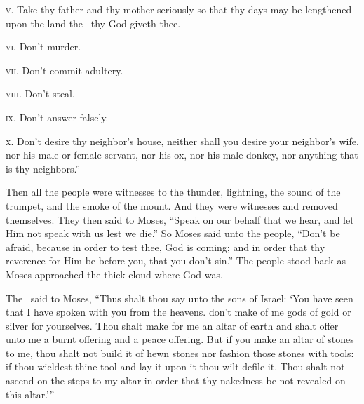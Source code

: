 \begin{inparaenum}
   \textsc{v.} Take thy father and thy mother seriously so that thy days may be lengthened upon the land the \lord\ thy God giveth thee.%
  
   \textsc{vi.} Don't murder.%
  
   \textsc{vii.} Don't commit adultery.%
  
   \textsc{viii.} Don't steal.%
  
   \textsc{ix.} Don't answer falsely.%
  
   \textsc{x.} Don't desire thy neighbor's house, neither shall you desire your neighbor's wife, nor his male or female servant, nor his ox, nor his male donkey, nor anything that is thy neighbors.''%
  
   Then all the people were witnesses to the thunder, lightning, the sound of the trumpet, and the smoke of the mount. And they were witnesses and removed themselves.%
   They then said to Moses, ``Speak on our behalf that we hear, and let Him not speak with us lest we die.''%
   So Moses said unto the people, ``Don't be afraid, because in order to test thee, God is coming; and in order that thy reverence for Him be before you, that you don't sin.''%
   The people stood back as Moses approached the thick cloud where God was.%
  
   The \lord\ said to Moses, ``Thus shalt thou say unto the sons of Israel: `You have seen that I have spoken with you from the heavens.%
   don't make of me gods of gold or silver for yourselves.%
   Thou shalt make for me an altar of earth and shalt offer unto me a burnt offering and a peace offering.%
   But if you make an altar of stones to me, thou shalt not build it of hewn stones nor fashion those stones with tools: if thou wieldest thine tool and lay it upon it thou wilt defile it.%
   Thou shalt not ascend on the steps to my altar in order that thy nakedness be not revealed on this altar.'\thinspace''%
\end{inparaenum}
